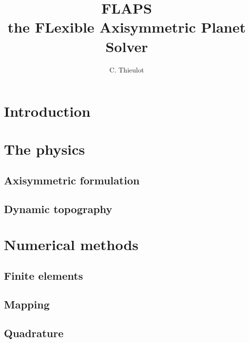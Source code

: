 \documentclass[a4paper,12pt]{article}
\begin{document}
\title{FLAPS \\ the FLexible Axisymmetric Planet Solver}
\author{C. Thieulot}
\maketitle

\section{Introduction}



\newpage
\section{The physics}

\subsection{Axisymmetric formulation}


\subsection{Dynamic topography}



\newpage
\section{Numerical methods}

\subsection{Finite elements}

\subsection{Mapping}


\subsection{Quadrature}
\end{document}
